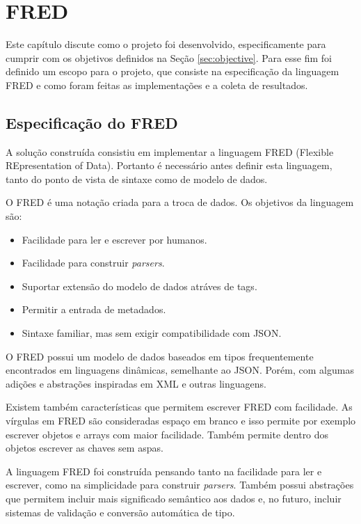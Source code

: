 \chapter[FRED]{FRED}

Este capítulo discute como o projeto foi desenvolvido, especificamente
para cumprir com os objetivos definidos na Seção \ref{sec:objective}. Para esse fim
foi definido um escopo para o projeto, que consiste na especificação da linguagem FRED e 
como foram feitas as implementações e a coleta de resultados.

\section{Especificação do FRED}
\label{sec:solution}

A solução construída consistiu em implementar a linguagem FRED (Flexible REpresentation of Data).
Portanto é necessário antes definir esta linguagem, tanto do ponto de vista de sintaxe como de modelo de dados.

O FRED é uma notação criada para a troca de dados. Os
objetivos da linguagem são:

\begin{itemize}
    \item Facilidade para ler e escrever por humanos.
    \item Facilidade para construir \textit{parsers}.
    \item Suportar extensão do modelo de dados atráves de tags.
    \item Permitir a entrada de metadados.
    \item Sintaxe familiar, mas sem exigir compatibilidade com JSON.
\end{itemize}

O FRED possui um modelo de dados baseados em tipos frequentemente encontrados em linguagens
dinâmicas, semelhante ao JSON. Porém, com algumas adições e abstrações 
inspiradas em XML e outras linguagens.

Existem também características que permitem escrever FRED com facilidade. As vírgulas
em FRED são consideradas espaço em branco e isso permite por exemplo escrever objetos
e arrays com maior facilidade. Também permite dentro dos objetos escrever as chaves sem
aspas.

A linguagem FRED foi construída pensando tanto na facilidade para ler e escrever, como na
simplicidade para construir \textit{parsers}. Também possui abstrações que permitem incluir
mais significado semântico aos dados e, no futuro, incluir sistemas de validação e conversão
automática de tipo. 

